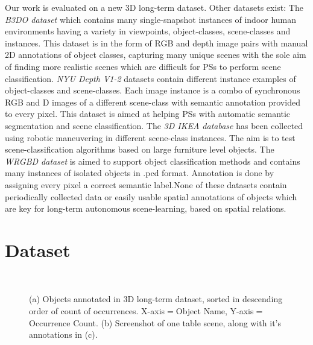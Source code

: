 \documentclass[letterpaper]{article}
\newif\ifdraft
\newcommand{\points}[1]{\textcolor{Gray}{points-to-remember:\ #1}}
\newcommand{\points}[1]{}
\begin{document}
Our work is evaluated on a new 3D long-term dataset. Other datasets exist: The \textit{B3DO dataset} \cite{Janoch:ICCV2011} which contains many single-snapshot instances of indoor human environments having a variety in viewpoints, object-classes, scene-classes and instances. This dataset is in the form of RGB and depth image pairs with manual 2D annotations of object classes, capturing many unique scenes with the sole aim of finding more realistic scenes which are difficult for PSs to perform scene classification. \textit{NYU Depth V1-2} \cite{Silberman:ECCV2012} datasets contain different instance examples of object-classes and scene-classes. Each image instance is a combo of synchronous RGB and D images of a different scene-class with semantic annotation provided to every pixel. This dataset is aimed at helping PSs with automatic semantic segmentation and scene classification. The \textit{3D IKEA database} \cite{Swadzba:RAS2012} has been collected using robotic maneuvering in different scene-class instances. The aim is to test scene-classification algorithms based on large furniture level objects. The \textit{WRGBD dataset} \cite{Lai:ICRA2011} is aimed to support object classification methods and contains many instances of isolated objects in .pcd format. Annotation is done by assigning every pixel a correct semantic label.None of these datasets contain periodically collected data or easily usable spatial annotations of objects which are key for long-term autonomous scene-learning, based on spatial relations.


\ifdraft
\points{
\begin{enumerate}
	\item QSR - LEEDS activity recognition
	\item Datasets out there and why we cannot use them
	\item State of art object classification / single object classification
	\item Constellations or group estimation
	\item Object search from CAS
\end{enumerate}
}
\fi
\section{Dataset}
\label{sec:Dataset}
\begin{figure}[t]
\begin{center}
\quad
{}\\
\caption{(a) Objects annotated in 3D long-term dataset, sorted in descending order of count of occurrences. X-axis$=$Object Name, Y-axis$=$Occurrence Count. (b) Screenshot of one table scene, along with it's annotations in (c).}

\end{center}
\end{figure}
\end{document}
